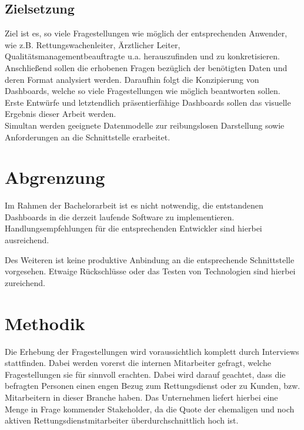 \documentclass[12pt]{article}
\begin{document}
\subsection{Zielsetzung}\label{ziel}
Ziel ist es, so viele Fragestellungen wie möglich der entsprechenden Anwender,
wie z.B. Rettungswachenleiter, Ärztlicher Leiter,
Qualitätsmanagement\-beauftragte u.a. herauszufinden und zu konkretisieren.
Anschließend sollen die erhobenen Fragen bezüglich der benötigten Daten und
deren Format analysiert werden. Daraufhin folgt die Konzipierung von Dashboards,
welche so viele Fragestellungen wie möglich beantworten sollen. Erste Ent\-würfe
und letztendlich präsentierfähige Dashboards sollen das visuelle Ergebnis dieser
Arbeit werden. \\
Simultan werden geeignete Datenmodelle zur reibungslosen Darstellung sowie
Anforderungen an die Schnittstelle erarbeitet.



\section{Abgrenzung} \label{abgrenzung}
Im Rahmen der Bachelorarbeit ist es nicht notwendig, die entstandenen Dashboards
in die derzeit laufende Software zu implementieren. Handlungs\-empfehlungen für
die entsprechenden Entwickler sind hierbei ausreichend.

Des Weiteren ist keine produktive Anbindung an die entsprechende Schnitt\-stelle
vorgesehen. Etwaige Rückschlüsse oder das Testen von Technologien sind hierbei
zureichend.

\section{Methodik}\label{methodik}
Die Erhebung der Fragestellungen wird voraussichtlich komplett durch Interviews
stattfinden. Dabei werden vorerst die internen Mitarbeiter gefragt, welche
Fragestellungen sie für sinnvoll erachten. Dabei wird darauf geachtet, dass die
befragten Personen einen engen Bezug zum Rettungsdienst oder zu Kunden, bzw.
Mitarbeitern in dieser Branche haben. Das Unternehmen liefert hierbei eine Menge
in Frage kommender Stakeholder, da die Quote der ehemaligen und noch aktiven
Rettungsdienstmitarbeiter überdurchschnittlich hoch ist. 
\end{document}
